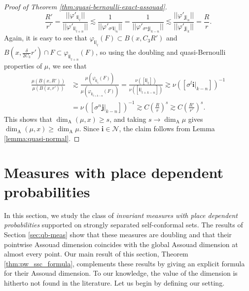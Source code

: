 \documentclass{PRM}
\theoremstyle{plain}
\theoremstyle{definition}
\theoremstyle{remark}
\begin{document}
\begin{proof}[Proof of Theorem \ref{thm:quasi-bernoulli-exact-assouad}]
\begin{equation*}
    \frac{R'}{r'}=\frac{||\varphi'_{\mathbf{i}|_{l}}||}{||\varphi'_{\mathbf{i}|_{l+n}}||}\lesssim \frac{1}{||\varphi'_{\sigma^l\mathbf{i}|_{n}}||}=\frac{1}{||\varphi'_{\sigma^{n}\mathbf{j}|_{k-n}}||}\lesssim\frac{ ||\varphi'_{\mathbf{j}|_{n}}||}{||\varphi'_{\mathbf{j}|_{k}}||}=\frac{R}{r}.
\end{equation*}
Again, it is easy to see that $\varphi_{\mathbf{i}|_{l}}(F)\subset B(x,C_3R')$ and $B(x,\frac{\delta}{2C_3}r')\cap F\subset \varphi_{\mathbf{i}|_{l+n}}(F)$, so using the doubling and quasi-Bernoulli properties of $\mu$, we see that
\begin{align*}
    \frac{\mu(B(x,R'))}{\mu(B(x,r'))}&\gtrsim\frac{\mu(\varphi_{\mathbf{i}|_{l}}(F))}{\mu(\varphi_{\mathbf{i}|_{l+k-n}}(F))}=\frac{\nu([\mathbf{i}|_{l}])}{\nu([\mathbf{i}|_{l+k-n}])}\gtrsim \nu([\sigma^l\mathbf{i}|_{k-n}])^{-1}\\
    &=\nu([\sigma^{n}\mathbf{j}|_{k-n}])^{-1} \gtrsim C\left(\frac{R}{r}\right)^s\gtrsim C\left(\frac{R'}{r'}\right)^s.
\end{align*}
This shows that $\dim_{\mathrm{A}}(\mu,x)\geq s$, and taking $s\to\dim_{\mathrm{A}}\mu$ gives $\dim_{\mathrm{A}}(\mu,x)\geq \dim_{\mathrm{A}}\mu$. Since $\mathbf{i}\in\mathcal{N}$, the claim follows from Lemma \ref{lemma:quasi-normal}.
\end{proof}


\section{Measures with place dependent probabilities}\label{sec:invmeas}
In this section, we study the class of \emph{invariant measures with place dependent probabilities} supported on strongly separated self-conformal sets. The results of Section \ref{sec:qb-meas} show that these measures are doubling and that their pointwise Assouad dimension coincides with the global Assouad dimension at almost every point. Our main result of this section, Theorem \ref{thm:pw_ssc_formula}, complements these results by giving an explicit formula for their Assouad dimension. To our knowledge, the value of the dimension is hitherto not found in the literature. Let us begin by defining our setting.
\end{document}

